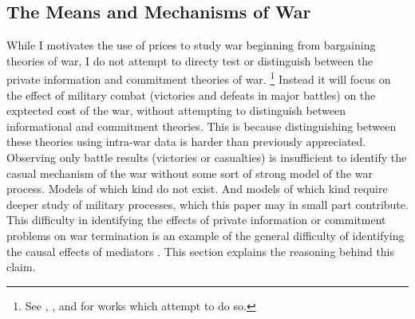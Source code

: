 \subsection{The Means and Mechanisms of War}
\label{bonds_battles:sec:means-mechanisms-war}

While I motivates the use of prices to study war beginning from bargaining theories of war, I do not attempt to directy test or distinguish between the private information and commitment theories of war.%
\footnote{See \textcite{Ramsay2008}, \textcite{Weisiger2015}, and \textcite{Reiter2009} for works which attempt to do so.}
Instead it will focus on the effect of military combat (victories and defeats in major battles) on the exptected cost of the war, without attempting to distinguish between informational and commitment theories.
This is because distinguishing between these theories using intra-war data is harder than previously appreciated.
Observing only battle results (victories or casualties) is insufficient to identify the casual mechanism of the war without some sort of strong model of the war process.
Models of which kind do not exist.
And models of which kind require deeper study of military processes, which this paper may in small part contribute.
This difficulty in identifying the effects of private information or commitment problems on war termination is an example of the general difficulty of identifying the causal effects of mediators \parencite{Keele2015a}.
This section explains the reasoning behind this claim.

